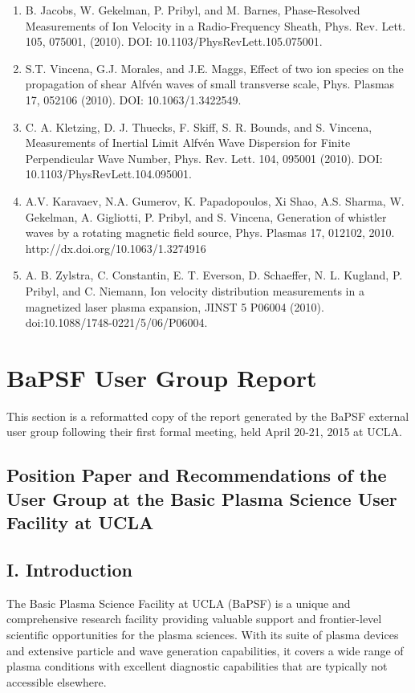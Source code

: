 \documentclass[11pt]{article}
\begin{document}
\begin{enumerate}
\item   B. Jacobs, W. Gekelman, P. Pribyl, and M. Barnes, Phase-Resolved Measurements of Ion Velocity in a Radio-Frequency Sheath, Phys. Rev. Lett. 105, 075001, (2010). DOI: 10.1103/PhysRevLett.105.075001.

\item   S.T. Vincena, G.J. Morales, and J.E. Maggs, Effect of two ion species on the propagation of shear Alfv\'{e}n waves of small transverse scale, Phys. Plasmas 17, 052106 (2010). DOI: 10.1063/1.3422549.

\item   C. A. Kletzing, D. J. Thuecks, F. Skiff, S. R. Bounds, and S. Vincena, Measurements of Inertial Limit Alfv\'{e}n Wave Dispersion for Finite Perpendicular Wave Number, Phys. Rev. Lett. 104, 095001 (2010). DOI: 10.1103/PhysRevLett.104.095001.

\item  A.V. Karavaev, N.A. Gumerov, K. Papadopoulos, Xi Shao, A.S. Sharma, W. Gekelman, A. Gigliotti, P. Pribyl, and S. Vincena, Generation of whistler waves by a rotating magnetic field source, Phys. Plasmas 17, 012102, 2010. http://dx.doi.org/10.1063/1.3274916

\item  A. B. Zylstra, C. Constantin, E. T. Everson, D. Schaeffer, N. L. Kugland, P. Pribyl, and C. Niemann, Ion velocity distribution measurements in a magnetized laser plasma expansion, JINST 5 P06004 (2010). doi:10.1088/1748-0221/5/06/P06004.

\end{enumerate}

\newpage

\section{BaPSF User Group Report}
This section is a reformatted copy of the report generated by the BaPSF external user group following their first formal
meeting, held April 20-21, 2015 at UCLA.

\begin{center}
\subsection{Position Paper and Recommendations of the User Group
at the Basic Plasma Science User Facility at UCLA}
\end{center}

\subsection{I. Introduction}
The Basic Plasma Science Facility at UCLA (BaPSF) is a unique and comprehensive
research facility providing valuable support and frontier-level scientific opportunities for
the plasma sciences. With its suite of plasma devices and extensive particle and wave
generation capabilities, it covers a wide range of plasma conditions with excellent
diagnostic capabilities that are typically not accessible elsewhere.
\end{document}
